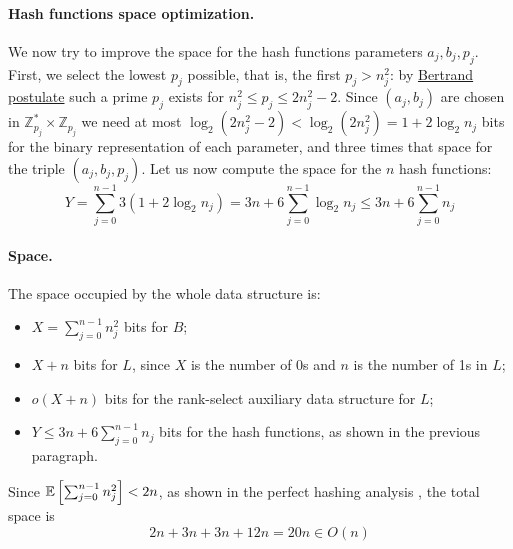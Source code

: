 \paragraph{Hash functions space optimization.} We now try to improve the space for the hash functions parameters $a_j, b_j, p_j$. First, we select the lowest $p_j$ possible, that is, the first $p_j > n_j^2$: by \href{https://en.wikipedia.org/wiki/Bertrand\%27s_postulate}{Bertrand postulate} such a prime $p_j$ exists for $n_j^2 \leq p_j \leq 2n_j^2 - 2$. Since $(a_j, b_j)$ are chosen in $\mathbb{Z}_{p_j}^* \times \mathbb{Z}_{p_j}$ we need at most $\log_2 (2n_j^2-2) < \log_2 (2n_j^2) = 1 + 2\log_2 n_j$ bits for the binary representation of each parameter, and three times that space for the triple $(a_j, b_j, p_j)$. Let us now compute the space for the $n$ hash functions:
\begin{equation*}
  Y = \sum_{j=0}^{n-1} 3{(1 + 2\log_2 n_j)}
    = 3n + 6\sum_{j=0}^{n-1} \log_2 n_j
    \leq 3n + 6\sum_{j=0}^{n-1} n_j
\end{equation*}

\paragraph{Space.} The space occupied by the whole data structure is:
\begin{itemize}
  \item $X = \sum_{j=0}^{n-1}n_j^2$ bits for $B$;
  \item $X + n$ bits for $L$, since $X$ is the number of 0s and $n$ is the number of 1s in $L$;
  \item $o(X + n)$ bits for the rank-select auxiliary data structure for $L$;
  \item $Y \leq 3n + 6\sum_{j=0}^{n-1} n_j$ bits for the hash functions, as shown in the previous paragraph.
\end{itemize}
Since $\mathbb{E}\left[{\sum_{j=0}^{n-1}n_j^2}\right] < 2n$, as shown in the perfect hashing analysis \cite[281]{Cormen09}, the total space is 
$$2n + 3n + 3n + 12n = 20n \in O(n)$$
